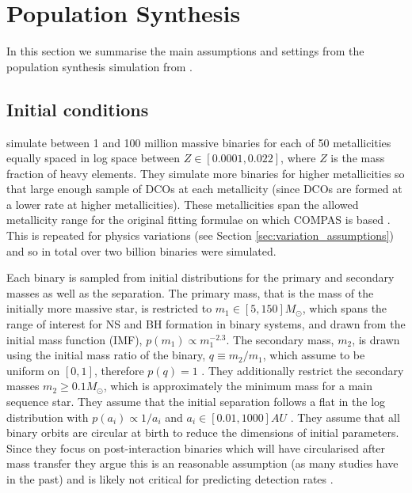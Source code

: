 \section{Population Synthesis}\label{app:pop_synth}

In this section we summarise the main assumptions and settings from the population synthesis simulation from \citet{Broekgaarden+2021,Broekgaarden+2021b}.

\subsection{Initial conditions}

\citet{Broekgaarden+2021,Broekgaarden+2021b} simulate between 1 and 100 million massive binaries for each of 50 metallicities equally spaced in log space between $Z \in [0.0001, 0.022]$, where $Z$ is the mass fraction of heavy elements. They simulate more binaries for higher metallicities so that large enough sample of DCOs at each metallicity (since DCOs are formed at a lower rate at higher metallicities). These metallicities span the allowed metallicity range for the original fitting formulae on which COMPAS is based \citep{Hurley+2000}. This is repeated for \nMinusOneModels{} physics variations (see Section \ref{sec:variation_assumptions}) and so in total over two billion binaries were simulated.

Each binary is sampled from initial distributions for the primary and secondary masses as well as the separation. The primary mass, that is the mass of the initially more massive star, is restricted to $m_1 \in [5, 150] \unit{M_{\odot}}$, which spans the range of interest for NS and BH formation in binary systems, and drawn from the \citet{Kroupa+2001} initial mass function (IMF), $p(m_1) \propto m_1^{-2.3}$. The secondary mass, $m_2$, is drawn using the initial mass ratio of the binary, $q \equiv m_2 / m_1$, which \citet{Broekgaarden+2021,Broekgaarden+2021b} assume to be uniform on $[0, 1]$, therefore $p(q) = 1$ \citep[e.g.\ consistent with][]{Sana+2012}. They additionally restrict the secondary masses $m_2 \ge 0.1 \unit{M_{\odot}}$, which is approximately the minimum mass for a main sequence star. They assume that the initial separation follows a flat in the log distribution with $p(a_i) \propto 1 / a_i$ and $a_i \in [0.01, 1000] \unit{AU}$ \citep{Opik+1924, Abt+1983}. They assume that all binary orbits are circular at birth to reduce the dimensions of initial parameters. Since they focus on post-interaction binaries which will have circularised after mass transfer they argue this is an reasonable assumption (as many studies have in the past) and is likely not critical for predicting detection rates \citep{Hurley+2002, deMink+2015}.

